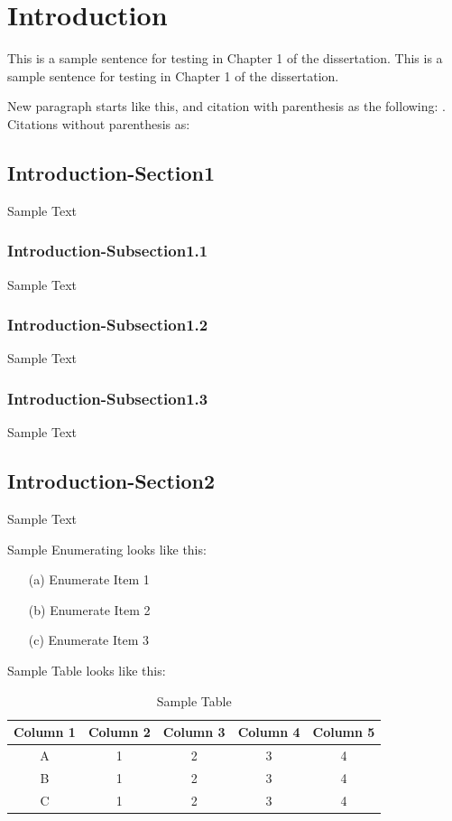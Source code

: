 \documentclass[oneside, phd]{snuthesis_utf8_eng}
\begin{document}


\chapter{Introduction}\label{c1}
This is a sample sentence for testing in Chapter 1 of the dissertation. This is a sample sentence for testing in Chapter 1 of the dissertation. 

New paragraph starts like this, and citation with parenthesis as the following: \citep{bloschl:2019twenty}.
Citations without parenthesis as: \cite{bloschl:2019twenty}


\newpage
\section{Introduction-Section1}\label{s1.1}
Sample Text


\subsection{Introduction-Subsection1.1}
Sample Text


\subsection{Introduction-Subsection1.2}
Sample Text 


\subsection{Introduction-Subsection1.3}
Sample Text


\newpage
\section{Introduction-Section2}\label{s1.2}
Sample Text

Sample Enumerating looks like this:
\begin{enumerate}
\item[(a)] Enumerate Item 1
\item[(b)] Enumerate Item 2
\item[(c)] Enumerate Item 3
\end{enumerate}


Sample Table looks like this:
\begin{table}[h] \centering
\caption{Sample Table}
\begin{tabular}{c|c|c|c|c}
\toprule
Column 1 & Column 2 & Column 3 & Column 4 & Column 5 \\
\hline \hline
A & 1 & 2 & 3 & 4 \\
\hline
B & 1 & 2 & 3 & 4 \\
\hline
C & 1 & 2 & 3 & 4 \\
\hline
\end{tabular}\label{table:1} 
\end{table}
\end{document}
